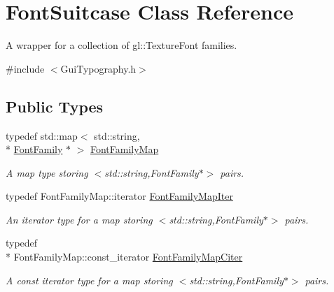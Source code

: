 \hypertarget{class_font_suitcase}{\section{Font\-Suitcase Class Reference}
\label{class_font_suitcase}
}


A wrapper for a collection of gl\-::\-Texture\-Font families.  




{\ttfamily \#include $<$Gui\-Typography.\-h$>$}

\subsection*{Public Types}
\begin{DoxyCompactItemize}
\item 
\hypertarget{class_font_suitcase_ade68c58fa69acfbca34477adc97c595d}{typedef std\-::map$<$ std\-::string, \\*
\hyperlink{class_font_family}{Font\-Family} $\ast$ $>$ \hyperlink{class_font_suitcase_ade68c58fa69acfbca34477adc97c595d}{Font\-Family\-Map}}\label{class_font_suitcase_ade68c58fa69acfbca34477adc97c595d}

\begin{DoxyCompactList}\small\item\em A map type storing $<$std\-::string,Font\-Family$\ast$$>$ pairs. \end{DoxyCompactList}\item 
\hypertarget{class_font_suitcase_a2f0379c4fd9b83cf6f2fd079bd708de8}{typedef Font\-Family\-Map\-::iterator \hyperlink{class_font_suitcase_a2f0379c4fd9b83cf6f2fd079bd708de8}{Font\-Family\-Map\-Iter}}\label{class_font_suitcase_a2f0379c4fd9b83cf6f2fd079bd708de8}

\begin{DoxyCompactList}\small\item\em An iterator type for a map storing $<$std\-::string,Font\-Family$\ast$$>$ pairs. \end{DoxyCompactList}\item 
\hypertarget{class_font_suitcase_a9edf05903ece41e412faef2e22837b7d}{typedef \\*
Font\-Family\-Map\-::const\-\_\-iterator \hyperlink{class_font_suitcase_a9edf05903ece41e412faef2e22837b7d}{Font\-Family\-Map\-Citer}}\label{class_font_suitcase_a9edf05903ece41e412faef2e22837b7d}

\begin{DoxyCompactList}\small\item\em A const iterator type for a map storing $<$std\-::string,Font\-Family$\ast$$>$ pairs. \end{DoxyCompactList}\end{DoxyCompactItemize}
